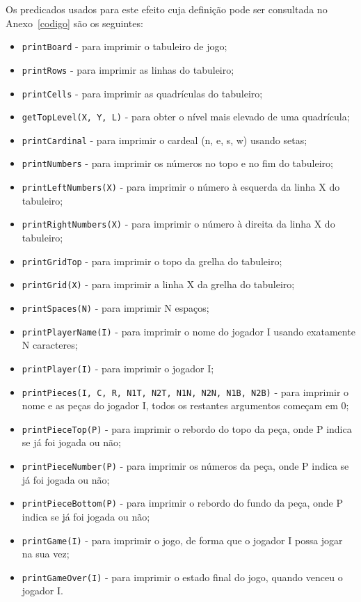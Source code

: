 \documentclass[a4paper]{article}
\begin{document}
Os predicados usados para este efeito cuja definição pode ser consultada no Anexo~\ref{codigo} são os seguintes:
\begin{itemize}
	\item \verb|printBoard| - para imprimir o tabuleiro de jogo;
	\item \verb|printRows| - para imprimir as linhas do tabuleiro;
	\item \verb|printCells| - para imprimir as quadrículas do tabuleiro;
	\item \verb|getTopLevel(X, Y, L)| - para obter o nível mais elevado de uma quadrícula;
	\item \verb|printCardinal| - para imprimir o cardeal (n, e, s, w) usando setas;
	\item \verb|printNumbers| - para imprimir os números no topo e no fim do tabuleiro;
	\item \verb|printLeftNumbers(X)| - para imprimir o número à esquerda da linha X do tabuleiro;
	\item \verb|printRightNumbers(X)| - para imprimir o número à direita da linha X do tabuleiro;
	\item \verb|printGridTop| - para imprimir o topo da grelha do tabuleiro;
	\item \verb|printGrid(X)| - para imprimir a linha X da grelha do tabuleiro;
	\item \verb|printSpaces(N)| - para imprimir N espaços;
	\item \verb|printPlayerName(I)| - para imprimir o nome do jogador I usando exatamente N caracteres;
	\item \verb|printPlayer(I)| - para imprimir o jogador I;
	\item \verb|printPieces(I, C, R, N1T, N2T, N1N, N2N, N1B, N2B)| - para imprimir o nome e as peças do jogador I, todos os restantes argumentos começam em 0;
	\item \verb|printPieceTop(P)| - para imprimir o rebordo do topo da peça, onde P indica se já foi jogada ou não;
	\item \verb|printPieceNumber(P)| - para imprimir os números da peça, onde P indica se já foi jogada ou não;
	\item \verb|printPieceBottom(P)| - para imprimir o rebordo do fundo da peça, onde P indica se já foi jogada ou não;
	\item \verb|printGame(I)| - para imprimir o jogo, de forma que o jogador I possa jogar na sua vez;
	\item \verb|printGameOver(I)| - para imprimir o estado final do jogo, quando venceu o jogador I.
\end{itemize}
\end{document}
